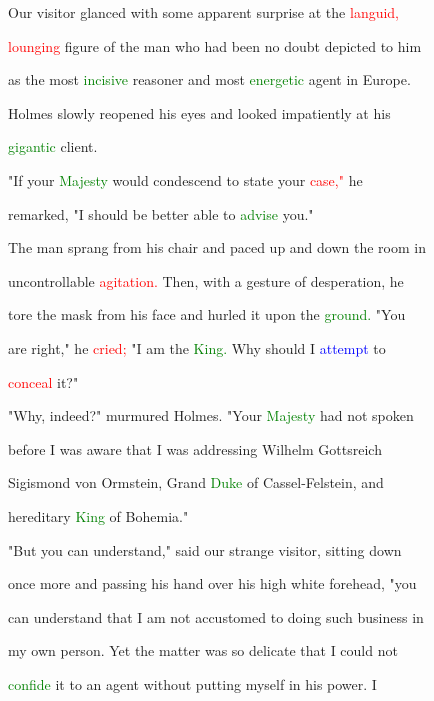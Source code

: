  Our \textcolor{BurntOrange}{visitor} glanced with some apparent \textcolor{BurntOrange}{surprise} at the \textcolor{red}{languid,}

 \textcolor{red}{lounging} figure of the man who had been no \textcolor{BurntOrange}{doubt} depicted to him

 as the most \textcolor{green}{incisive} reasoner and most \textcolor{green}{energetic} agent in Europe.

 Holmes slowly reopened his eyes and looked impatiently at his

 \textcolor{green}{gigantic} client.



 "If your \textcolor{green}{Majesty} would condescend to state your \textcolor{red}{case,"} he

 remarked, "I should be better able to \textcolor{green}{advise} you."



 The man sprang from his chair and paced up and down the room in

 \textcolor{BurntOrange}{uncontrollable} \textcolor{red}{agitation.} Then, with a gesture of desperation, he

 tore the mask from his face and hurled it upon the \textcolor{green}{ground.} "You

 are right," he \textcolor{red}{cried;} "I am the \textcolor{green}{King.} Why should I \textcolor{blue}{attempt} to

 \textcolor{red}{conceal} it?"



 "Why, indeed?" murmured Holmes. "Your \textcolor{green}{Majesty} had not spoken

 before I was aware that I was addressing Wilhelm Gottsreich

 Sigismond von Ormstein, Grand \textcolor{green}{Duke} of Cassel-Felstein, and

 hereditary \textcolor{green}{King} of Bohemia."



 "But you can understand," said our strange \textcolor{BurntOrange}{visitor,} sitting down

 once more and passing his hand over his high \textcolor{BurntOrange}{white} forehead, "you

 can understand that I am not accustomed to doing such business in

 my own person. Yet the matter was so delicate that I could not

 \textcolor{green}{confide} it to an agent without putting myself in his power. I

